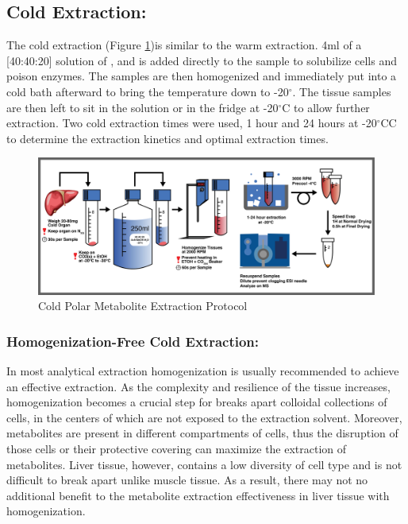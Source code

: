 \documentclass[a4paper,11pt,twoside]{book}
\begin{document}
	\subsection*{Cold Extraction:}
		
	The cold extraction (Figure \ref{fig:Cold Extraction Protocol})is similar to the warm extraction. 4ml of a [40:40:20] solution of ,  and  is added directly to the sample to solubilize cells and poison enzymes. The samples are then homogenized and immediately put into a cold bath afterward to bring the temperature down to -20$^\circ$. The tissue samples are then left to sit in the solution or in the fridge at -20$^{\circ}$C to allow further extraction. Two cold extraction times were used, 1 hour and 24 hours at -20$^{\circ}$CC to determine the extraction kinetics and optimal extraction times. 
		
	\begin{figure}
		\centering
		\includegraphics[width=\linewidth]{2.Optimizaiton_Figures/Metab-Cold-Proto-MH-20170120}
		\caption{Cold Polar Metabolite Extraction Protocol}
		\label{fig:Cold Extraction Protocol}
	\end{figure}
		
	\subsubsection*{Homogenization-Free Cold Extraction:}
	
    In most analytical extraction homogenization is usually recommended to achieve an effective extraction\citep{Mushtaq2014ExtractionMetabolome}. As the complexity and resilience of the tissue increases, homogenization becomes a crucial step for breaks apart colloidal collections of cells, in the centers of which are not exposed to the extraction solvent. Moreover, metabolites are present in different compartments of cells, thus the disruption of those cells or their protective covering can maximize the extraction of metabolites. Liver tissue, however, contains a low diversity of cell type and is not difficult to break apart unlike muscle tissue. As a result, there may not no additional benefit to the metabolite extraction effectiveness in liver tissue with homogenization.
\end{document}
